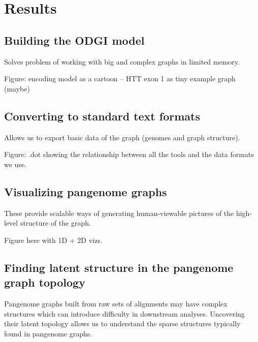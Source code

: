 \documentclass{bioinfo}
\begin{document}
\section{Results}

\subsection{Building the \textsc{ODGI} model}


Solves problem of working with big and complex graphs in limited memory.

Figure: encoding model as a cartoon --  HTT exon 1 as tiny example graph (maybe)

\subsection{Converting to standard text formats}


Allows us to export basic data of the graph (genomes and graph structure).

Figure: .dot showing the relationship between all the tools and the data formats we use.

\subsection{Visualizing pangenome graphs}


These provide scalable ways of generating human-viewable pictures of the high-level structure of the graph.

Figure here with 1D + 2D vizs.

\subsection{Finding latent structure in the pangenome graph topology}




Pangenome graphs built from raw sets of alignments may have complex structures which can introduce difficulty in downstream analyses. Uncovering their latent topology allows us to understand the sparse structures typically found in pangenome graphs.
\end{document}

